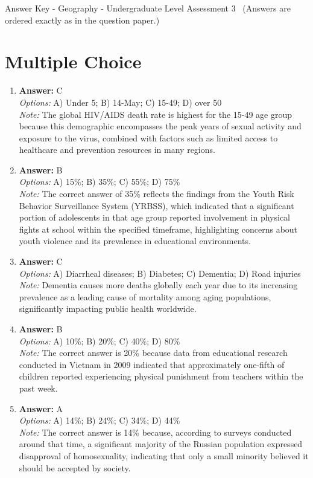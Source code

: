\documentclass[12pt]{article}
\begin{document}
\begin{center}
Answer Key - Geography - Undergraduate Level Assessment 3 \
\small (Answers are ordered exactly as in the question paper.)
\end{center}

\section*{Multiple Choice}
\begin{enumerate}[label=\arabic*.]
\item \textbf{Answer:} C
\\ \textit{Options:} A) Under 5; B) 14-May; C) 15-49; D) over 50
\\ \textit{Note:} The global HIV/AIDS death rate is highest for the 15-49 age group because this demographic encompasses the peak years of sexual activity and exposure to the virus, combined with factors such as limited access to healthcare and prevention resources in many regions.
\item \textbf{Answer:} B
\\ \textit{Options:} A) 15\%; B) 35\%; C) 55\%; D) 75\%
\\ \textit{Note:} The correct answer of 35\% reflects the findings from the Youth Risk Behavior Surveillance System (YRBSS), which indicated that a significant portion of adolescents in that age group reported involvement in physical fights at school within the specified timeframe, highlighting concerns about youth violence and its prevalence in educational environments.
\item \textbf{Answer:} C
\\ \textit{Options:} A) Diarrheal diseases; B) Diabetes; C) Dementia; D) Road injuries
\\ \textit{Note:} Dementia causes more deaths globally each year due to its increasing prevalence as a leading cause of mortality among aging populations, significantly impacting public health worldwide.
\item \textbf{Answer:} B
\\ \textit{Options:} A) 10\%; B) 20\%; C) 40\%; D) 80\%
\\ \textit{Note:} The correct answer is 20\% because data from educational research conducted in Vietnam in 2009 indicated that approximately one-fifth of children reported experiencing physical punishment from teachers within the past week.
\item \textbf{Answer:} A
\\ \textit{Options:} A) 14\%; B) 24\%; C) 34\%; D) 44\%
\\ \textit{Note:} The correct answer is 14\% because, according to surveys conducted around that time, a significant majority of the Russian population expressed disapproval of homosexuality, indicating that only a small minority believed it should be accepted by society.
\end{enumerate}
\end{document}

